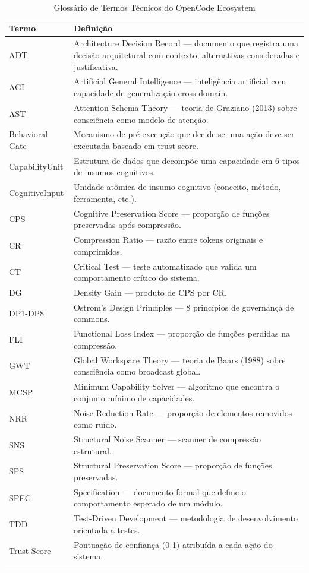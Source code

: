 \documentclass[12pt,a4paper,oneside]{abntex2}
\begin{document}
\begin{apendicesenv}
\begin{longtable}{lp{10cm}}
\toprule
\textbf{Termo} & \textbf{Definição} \\
\midrule
ADT & Architecture Decision Record — documento que registra uma decisão arquitetural com contexto, alternativas consideradas e justificativa. \\
AGI & Artificial General Intelligence — inteligência artificial com capacidade de generalização cross-domain. \\
AST & Attention Schema Theory — teoria de Graziano (2013) sobre consciência como modelo de atenção. \\
Behavioral Gate & Mecanismo de pré-execução que decide se uma ação deve ser executada baseado em trust score. \\
CapabilityUnit & Estrutura de dados que decompõe uma capacidade em 6 tipos de insumos cognitivos. \\
CognitiveInput & Unidade atômica de insumo cognitivo (conceito, método, ferramenta, etc.). \\
CPS & Cognitive Preservation Score — proporção de funções preservadas após compressão. \\
CR & Compression Ratio — razão entre tokens originais e comprimidos. \\
CT & Critical Test — teste automatizado que valida um comportamento crítico do sistema. \\
DG & Density Gain — produto de CPS por CR. \\
DP1-DP8 & Ostrom's Design Principles — 8 princípios de governança de commons. \\
FLI & Functional Loss Index — proporção de funções perdidas na compressão. \\
GWT & Global Workspace Theory — teoria de Baars (1988) sobre consciência como broadcast global. \\
MCSP & Minimum Capability Solver — algoritmo que encontra o conjunto mínimo de capacidades. \\
NRR & Noise Reduction Rate — proporção de elementos removidos como ruído. \\
SNS & Structural Noise Scanner — scanner de compressão estrutural. \\
SPS & Structural Preservation Score — proporção de funções preservadas. \\
SPEC & Specification — documento formal que define o comportamento esperado de um módulo. \\
TDD & Test-Driven Development — metodologia de desenvolvimento orientada a testes. \\
Trust Score & Pontuação de confiança (0-1) atribuída a cada ação do sistema. \\
\bottomrule
\caption{Glossário de Termos Técnicos do OpenCode Ecosystem}
\end{longtable}


\end{apendicesenv}
\end{document}
